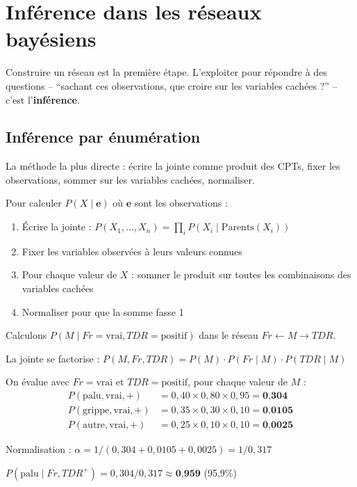 \documentclass[11pt,a4paper]{article}
\begin{document}
\section{Inférence dans les réseaux bayésiens}

Construire un réseau est la première étape. L'exploiter pour répondre à des questions -- ``sachant ces observations, que croire sur les variables cachées ?'' -- c'est l'\textbf{inférence}.

\subsection{Inférence par énumération}

La méthode la plus directe : écrire la jointe comme produit des CPTs, fixer les observations, sommer sur les variables cachées, normaliser.

\begin{recipebox}
Pour calculer $P(X \mid \mathbf{e})$ où $\mathbf{e}$ sont les observations :
\begin{enumerate}
    \item Écrire la jointe : $P(X_1, \ldots, X_n) = \prod_i P(X_i \mid \text{Parents}(X_i))$
    \item Fixer les variables observées à leurs valeurs connues
    \item Pour chaque valeur de $X$ : sommer le produit sur toutes les combinaisons des variables cachées
    \item Normaliser pour que la somme fasse 1
\end{enumerate}
\end{recipebox}

\begin{exemplebox}
Calculons $P(M \mid Fr = \text{vrai}, TDR = \text{positif})$ dans le réseau $Fr \leftarrow M \to TDR$.

La jointe se factorise : $P(M, Fr, TDR) = P(M) \cdot P(Fr \mid M) \cdot P(TDR \mid M)$

On évalue avec $Fr = \text{vrai}$ et $TDR = \text{positif}$, pour chaque valeur de $M$ :
\begin{align*}
P(\text{palu}, \text{vrai}, +) &= 0{,}40 \times 0{,}80 \times 0{,}95 = \textbf{0,304} \\
P(\text{grippe}, \text{vrai}, +) &= 0{,}35 \times 0{,}30 \times 0{,}10 = \textbf{0,0105} \\
P(\text{autre}, \text{vrai}, +) &= 0{,}25 \times 0{,}10 \times 0{,}10 = \textbf{0,0025}
\end{align*}

Normalisation : $\alpha = 1/(0{,}304 + 0{,}0105 + 0{,}0025) = 1/0{,}317$

$P(\text{palu} \mid Fr, TDR^+) = 0{,}304/0{,}317 \approx \textbf{0,959}$ \quad (95,9\%)
\end{exemplebox}
\end{document}
